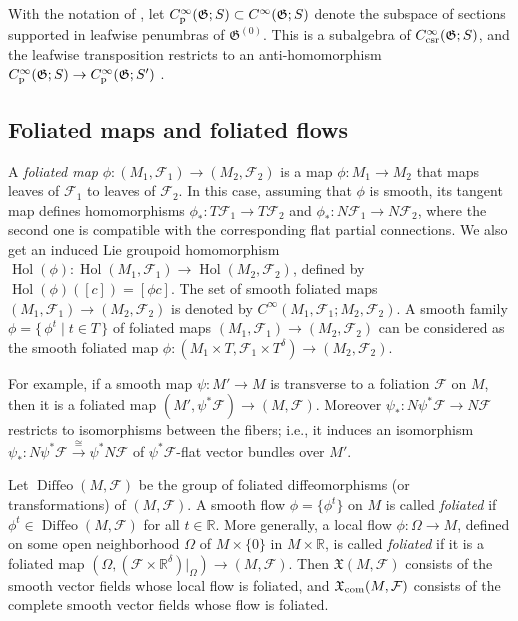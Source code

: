 \documentclass{memo-l}
\theoremstyle{plain}
\theoremstyle{definition}
\theoremstyle{remark}
\newcommand{\R}{\mathbb{R}}
\newcommand{\FF}{\mathcal{F}}
\newcommand{\fG}{\mathfrak{G}}
\newcommand{\fX}{\mathfrak{X}}
\newcommand{\Diffeo}{\operatorname{Diffeo}}
\newcommand{\Hol}{\operatorname{Hol}}
\newcommand{\fXcom}{\fX_{\text{\rm com}}}
\numberwithin{section}{chapter}
\numberwithin{equation}{section}%
\begin{document}
With the notation of , let $C^\infty_{\text{\rm p}}(\fG;S)\subset C^\infty(\fG;S)$ denote the subspace of sections supported in leafwise penumbras of $\fG^{(0)}$. This is a subalgebra of $C^\infty_{\text{\rm csr}}(\fG;S)$, and the leafwise transposition restricts to an anti-homomorphism $C^\infty_{\text{\rm p}}(\fG;S)\to C^\infty_{\text{\rm p}}(\fG;S')$ \cite[Section~4.6]{AlvKordyLeichtnam2020}.


\subsection{Foliated maps and foliated flows}\label{ss: fol maps}

A \emph{foliated map}  $\phi:(M_1,\FF_1)\to(M_2,\FF_2)$ is a map $\phi:M_1\to M_2$ that maps leaves of $\FF_1$ to leaves of $\FF_2$. In this case, assuming that $\phi$ is smooth, its tangent map defines homomorphisms $\phi_*:T\FF_1\to T\FF_2$ and $\phi_*:N\FF_1\to N\FF_2$, where the second one is compatible with the corresponding flat partial connections. We also get an induced Lie groupoid homomorphism $\Hol(\phi):\Hol(M_1,\FF_1)\to\Hol(M_2,\FF_2)$, defined by $\Hol(\phi)([c])=[\phi c]$. The set of smooth foliated maps $(M_1,\FF_1)\to(M_2,\FF_2)$ is denoted by $C^\infty(M_1,\FF_1;M_2,\FF_2)$.  A smooth family $\phi=\{\,\phi^t\mid t\in T\,\}$ of foliated maps $(M_1,\FF_1)\to(M_2,\FF_2)$ can be considered as the smooth foliated map $\phi:(M_1\times T,\FF_1\times T^\delta)\to(M_2,\FF_2)$.

For example, if a smooth map $\psi:M'\to M$ is transverse to a foliation $\FF$ on $M$, then it is a foliated map $(M',\psi^*\FF)\to(M,\FF)$. Moreover $\psi_*:N\psi^*\FF\to N\FF$ restricts to isomorphisms between the fibers; i.e., it induces an isomorphism $\psi_*:N\psi^*\FF\xrightarrow{\cong}\psi^*N\FF$ of $\psi^*\FF$-flat vector bundles over $M'$.

Let $\Diffeo(M,\FF)$ be the group of foliated diffeomorphisms (or transformations) of $(M,\FF)$. A smooth flow $\phi=\{\phi^t\}$ on $M$ is called \emph{foliated}  if $\phi^t\in\Diffeo(M,\FF)$ for all $t\in\R$. More generally, a local flow $\phi:\Omega\to M$, defined on some open neighborhood $\Omega$ of $M\times\{0\}$ in $M\times\R$, is called \emph{foliated} if it is a foliated map $(\Omega,(\FF\times\R^\delta)|_\Omega)\to(M,\FF)$. Then $\fX(M,\FF)$ consists of the smooth vector fields whose local flow is foliated, and $\fXcom(M,\FF)$ \index{$\fXcom(M,\FF)$} consists of the complete smooth vector fields whose flow is foliated.
\end{document}
